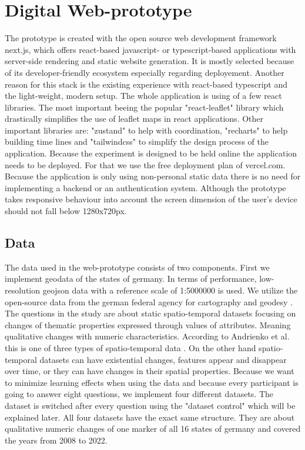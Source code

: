 \chapter{Digital Web-prototype}
The prototype is created with the open source web development framework next.js, which offers react-based javascript- or
typescript-based applications with server-side rendering and static website generation. It is mostly selected because of its
developer-friendly ecosystem especially regarding deployement. Another reason for this stack is the existing experience
with react-based typescript and the light-weight, modern setup. The whole application is using of a few react libraries.
The most important beeing the popular "react-leaflet" library which drastically simplifies the use of leaflet maps in react
applications. Other important libraries are: "zustand" to help with coordination, "recharts" to help building time lines and
"tailwindcss" to simplify the design process of the application. Because the experiment is designed to be held online the
application needs to be deployed. For that we use the free deployment plan of vercel.com. Because the application is only
using non-personal static data there is no need for implementing a backend or an authentication system. Although the prototype
takes responsive behaviour into account the screen dimension of the user's device should not fall below 1280x720px. 
\section{Data}
The data used in the web-prototype consists of two components. First we implement geodata of the states of germany. In terms of
performance, low-resolution geojson data with a reference scale of 1:5000000 is used. We utilize the open-source data
from the german federal agency for cartography and geodesy \citep*{gdz.bkg}. The questions in the study are about static
spatio-temporal datasets focusing on changes of thematic properties expressed through values of attributes. Meaning
qualitative changes with numeric characteristics. According to Andrienko et al. this is one of three types of spatio-temporal
data \citep*{Andrienko.2003}. On the other hand spatio-temporal datasets can have existential changes, features appear and
disappear over time, or they can have changes in their spatial properties. Because we want to minimize learning effects
when using the data and because every participant is going to answer eight questions, we implement four different
datasets. The dataset is switched after every question using the "dataset control" which will be explained later. All four datasets
have the exact same structure. They are about qualitative numeric changes of one marker of all 16 states of germany and covered
the years from 2008 to 2022.
